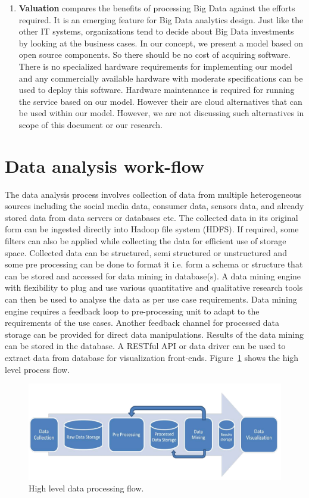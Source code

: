 \begin{enumerate}
\item \textbf{Valuation} compares the benefits of processing Big Data against the efforts required. It is an emerging feature for Big Data analytics design. Just like the other IT systems, organizations tend to decide about Big Data investments by looking at the business cases. In our concept, we present a model based on open source components. So there should be no cost of acquiring software. There is no specialized hardware requirements for implementing our model and any commercially available hardware with moderate specifications can be used to deploy this software. Hardware maintenance is required for running the service based on our model. However their are cloud alternatives that can be used within our model. However, we are not discussing such alternatives in scope of this document or our research.    
\end{enumerate} 
\section{Data analysis work-flow} \label{workflow}
 The data analysis process involves collection of data from multiple heterogeneous sources including the social media data, consumer data, sensors data, and already stored data from data servers or databases etc. The collected data in its original form can be ingested directly into Hadoop file system (HDFS). If required, some filters can also be applied while collecting the data for efficient use of storage space. Collected data can be structured, semi structured or unstructured and some pre processing can be done to format it i.e. form a schema or structure that can be stored and accessed for data mining in database(s). A data mining engine with flexibility to plug and use various quantitative and qualitative research tools can then be used to analyse the data as per use case requirements. Data mining engine requires a feedback loop to pre-processing unit to adapt to the requirements of the use cases. Another feedback channel for processed data storage can be provided for direct data manipulations. Results of the data mining can be stored in the database. A RESTful API or data driver can be used to extract data from database for visualization front-ends. Figure~\ref{fig:process} shows the high level process flow.
 \begin{figure}[!h]
   \begin{center}
     \includegraphics[width=\textwidth]{images/process.pdf}
     \caption{High level data processing flow.}
     \label{fig:process}
   \end{center}
 \end{figure} 
